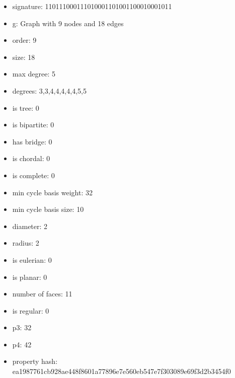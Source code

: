 \newpage
\begin{figure}
\end{figure}
\begin{itemize}
\item signature: 110111000111010001101001100010001011
\item g: Graph with 9 nodes and 18 edges
\item order: 9
\item size: 18
\item max degree: 5
\item degrees: 3,3,4,4,4,4,4,5,5
\item is tree: 0
\item is bipartite: 0
\item has bridge: 0
\item is chordal: 0
\item is complete: 0
\item min cycle basis weight: 32
\item min cycle basis size: 10
\item diameter: 2
\item radius: 2
\item is eulerian: 0
\item is planar: 0
\item number of faces: 11
\item is regular: 0
\item p3: 32
\item p4: 42
\item property hash: ea1987761cb928ae448f8601a77896e7e560eb547e7f303089e69f3d2b3454f0
\end{itemize}
